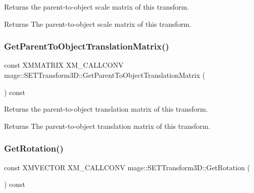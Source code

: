 Returns the parent-\/to-\/object scale matrix of this transform.

\begin{DoxyReturn}{Returns}
The parent-\/to-\/object scale matrix of this transform. 
\end{DoxyReturn}
\mbox{\label{classmage_1_1_s_e_t_transform3_d_aa0a2c7219d385789a53e84cc016a154a}} 
\subsubsection{\texorpdfstring{Get\+Parent\+To\+Object\+Translation\+Matrix()}{GetParentToObjectTranslationMatrix()}}
{\footnotesize\ttfamily const X\+M\+M\+A\+T\+R\+IX X\+M\+\_\+\+C\+A\+L\+L\+C\+O\+NV mage\+::\+S\+E\+T\+Transform3\+D\+::\+Get\+Parent\+To\+Object\+Translation\+Matrix (\begin{DoxyParamCaption}{ }\end{DoxyParamCaption}) const\hspace{0.3cm}{\ttfamily [noexcept]}}

Returns the parent-\/to-\/object translation matrix of this transform.

\begin{DoxyReturn}{Returns}
The parent-\/to-\/object translation matrix of this transform. 
\end{DoxyReturn}
\mbox{\label{classmage_1_1_s_e_t_transform3_d_ace617bb6fca4c08b99446552121b50c1}} 
\subsubsection{\texorpdfstring{Get\+Rotation()}{GetRotation()}}
{\footnotesize\ttfamily const X\+M\+V\+E\+C\+T\+OR X\+M\+\_\+\+C\+A\+L\+L\+C\+O\+NV mage\+::\+S\+E\+T\+Transform3\+D\+::\+Get\+Rotation (\begin{DoxyParamCaption}{ }\end{DoxyParamCaption}) const\hspace{0.3cm}{\ttfamily [noexcept]}}

